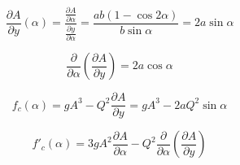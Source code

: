 \begin{equation}  
\frac{\partial A}{\partial y} (\alpha)= \frac{\frac{\partial A}{\partial \alpha}}{\frac{\partial y}{\partial \alpha}}=\frac{ab(1 - \cos2\alpha)}{b\sin \alpha} = 2a\sin \alpha
\end{equation}

\begin{equation}  
\frac{\partial}{\partial \alpha} \left(\frac{\partial A}{\partial y} \right) =2  a \cos \alpha
\end{equation}


\begin{equation}  
f_c(\alpha)= gA^3 - Q^2\frac{\partial A}{\partial y} =  gA^3 - 2aQ^2 \sin\alpha
\end{equation}

\begin{equation}  
f'_c(\alpha)= 3gA^2\frac{\partial A}{\partial \alpha} - Q^2\frac{\partial}{\partial \alpha} \left(\frac{\partial A}{\partial y} \right)
\end{equation}

